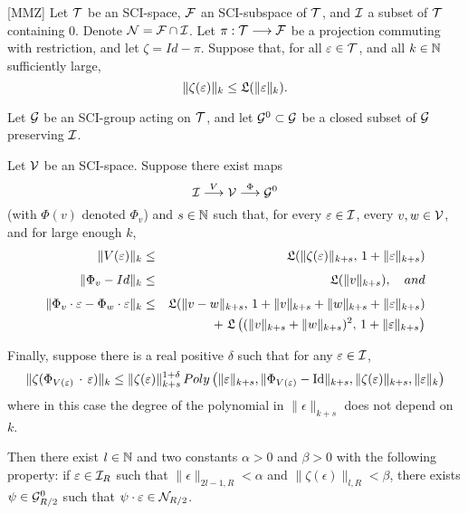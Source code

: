 \documentclass{article}
\begin{document}
\begin{thm}\label{Miranda-Monnier-Zung}[MMZ]
Let $\mathcal{T}$ be an SCI-space, $\mathcal{F}$ an SCI-subspace of $\mathcal{T}$, and $\mathcal{I}$ a subset of $\mathcal{T}$ containing $0$.  Denote $\mathcal{N} = \mathcal{F} \cap \mathcal{I}$.  Let $\pi : \mathcal{T} \longrightarrow \mathcal{F}$ be a projection commuting with restriction, and let $\zeta = Id - \pi$.  Suppose that, for all $\varepsilon \in \mathcal{T}$, and all $k \in \mathbb N$ sufficiently large,
\begin{equation}\label{MMZ1}
\|\zeta(\epsilon)\|_k \leq \LP(\|\epsilon\|_k).
\end{equation}

Let $\mathcal{G}$ be an SCI-group acting on $\mathcal{T}$, and let $\mathcal{G}^0 \subset \mathcal{G}$ be a closed subset of $\mathcal{G}$ preserving $\mathcal{I}$.

Let $\mathcal{V}$ be an SCI-space.  Suppose there exist maps
$$\mathcal{I} \overset{V}{\longrightarrow} \mathcal{V} \overset{\Phi}{\longrightarrow} \mathcal{G}^0$$
(with $\Phi(v)$ denoted $\Phi_v$) and $s \in \mathbb N$ such that, for every $\varepsilon \in \mathcal{I}$, every $v, w \in \mathcal{V}$, and for large enough $k$,
\begin{eqnarray}
\|V(\epsilon)\|_k &\leq& \LP(\|\zeta(\epsilon)\|_{k+s},\, 1+\|\epsilon\|_{k+s}) \label{MMZ2} \\[4pt]
\|\Phi_v - Id\|_k &\leq& \LP(\|v\|_{k+s}), \label{MMZ3} \quad\mathnormal{and} \\[4pt]
\|\Phi_v\cdot \epsilon - \Phi_w\cdot \epsilon\|_k &\leq& \LP(\|v - w\|_{k+s},\, 1 + \|v\|_{k+s} + \|w\|_{k+s}+\|\epsilon\|_{k+s}) \notag \\
& & \;+\; \LP\left((\|v\|_{k+s} + \|w\|_{k+s})^2,\, 1+\|\epsilon\|_{k+s}\right) \label{MMZ4}
\end{eqnarray}

Finally, suppose there is a real positive $\delta$ such that for any $\varepsilon\in\mathcal{I}$,
\begin{equation}
\|\zeta(\Phi_{V(\epsilon)}\, \cdot\, \epsilon)\|_k \leq \|\zeta(\epsilon)\|_{k+s}^{1+\delta}\, Poly\left(\|\epsilon\|_{k+s}, \|\Phi_{V(\epsilon)}-\Id\|_{k+s}, \|\zeta(\epsilon)\|_{k+s}, \|\epsilon\|_k\right) \label{MMZ5}
\end{equation}
where in this case the degree of the polynomial in $\|\epsilon\|_{k+s}$ does not depend on $k$.

Then there exist $l \in \mathbb N$ and two constants $\alpha>0$ and $\beta>0$ with the following property: if $\varepsilon \in \mathcal{I}_R$ such that $\|\epsilon\|_{2l-1,R} < \alpha$ and $\|\zeta(\epsilon)\|_{l,R} < \beta$, there exists $\psi \in \mathcal{G}^0_{R/2}$ such that $\psi \cdot \varepsilon \in \mathcal{N}_{R/2}$.
\end{thm}
\end{document}
